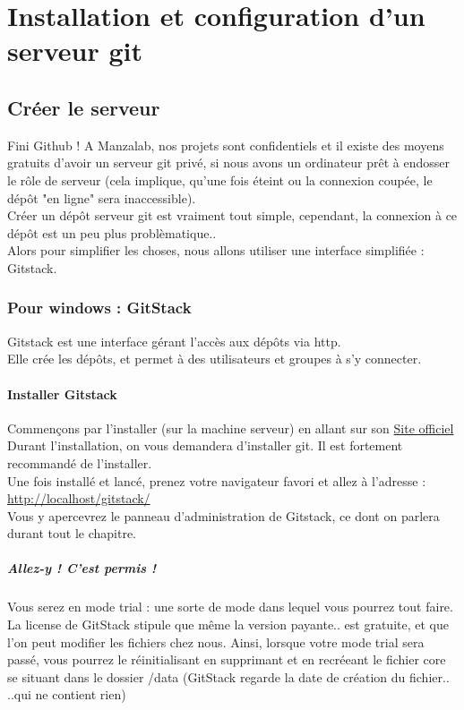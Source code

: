 \part{Installation et configuration d'un serveur git}
\chapter{Créer le serveur}

Fini Github ! A Manzalab, nos projets sont confidentiels et il existe des moyens gratuits d'avoir un serveur git privé, si nous avons un ordinateur prêt à endosser le rôle de serveur (cela implique, qu'une fois éteint ou la connexion coupée, le dépôt "en ligne" sera inaccessible).\\

Créer un dépôt serveur git est vraiment tout simple, cependant, la connexion à ce dépôt est un peu plus problèmatique..\\
Alors pour simplifier les choses, nous allons utiliser une interface simplifiée : Gitstack.

\section{Pour windows : GitStack}
Gitstack est une interface gérant l'accès aux dépôts via http.\\
Elle crée les dépôts, et permet à des utilisateurs et groupes à s'y connecter.\\

\subsection{Installer Gitstack}

Commençons par l'installer (sur la machine serveur) en allant sur son \href{http://gitstack.com/}{Site officiel}\\

Durant l'installation, on vous demandera d'installer git. Il est fortement recommandé de l'installer.\\

Une fois installé et lancé, prenez votre navigateur favori et allez à l'adresse : \href{http://localhost/gitstack/}{http://localhost/gitstack/}\\
Vous y apercevrez le panneau d'administration de Gitstack, ce dont on parlera durant tout le chapitre.
\newpage
\subsubsection{Allez-y ! C'est permis !}
Vous serez en mode trial : une sorte de mode dans lequel vous pourrez tout faire.\\
La license de GitStack stipule que même la version payante.. est gratuite, et que l'on peut modifier les fichiers chez nous.
Ainsi, lorsque votre mode trial sera passé, vous pourrez le réinitialisant en supprimant et en recréeant le fichier core se situant dans le dossier /data (GitStack regarde la date de création du fichier.. ..qui ne contient rien)\\

